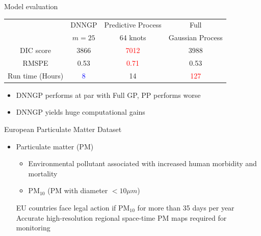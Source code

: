 \begin{frame}{Model evaluation}
\begin{table}[]
\centering
{\scriptsize
\begin{tabular}{cccc}
  \hline
                & DNNGP & Predictive Process &Full\\
                       &$m=25$            &64 knots          & Gaussian Process \\ 
  \hline
  DIC score &3866&\textcolor{red}{7012}&3988\\
  RMSPE  &0.53&\textcolor{red}{0.71}&0.53\\  \hline
  Run time (Hours) &\textcolor{blue}{8}&14&\textcolor{red}{127}\\
\hline
\end{tabular}
}
\end{table}

\begin{itemize}
\item DNNGP performs at par with Full GP, PP performs worse
\item DNNGP yields huge computational gains
\end{itemize}
\end{frame}

\begin{frame}{European Particulate Matter Dataset}
\begin{itemize}
\item Particulate matter (PM)
\begin{itemize}
\item Environmental pollutant associated with increased human morbidity and mortality
\item PM$_{10}$ (PM with diameter $< 10 \mu m$)
\end{itemize}
\myitem EU countries face legal action if PM$_{10}$  for more than 35 days per year
\myitem Accurate high-resolution regional space-time PM maps required for monitoring 
\end{itemize}
\end{frame}


